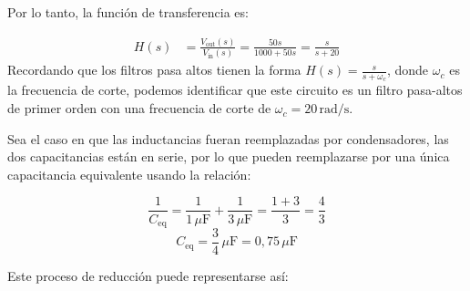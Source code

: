 \documentclass[
  11pt,
  letterpaper,
   addpoints,
   answers
  ]{exam}
\begin{document}
\begin{questions}
\begin{solution}
Por lo tanto, la función de transferencia es:

\begin{align}
    H(s) &= \frac{V_{\text{out}}(s)}{V_{\text{in}}(s)} = \frac{50s}{1000 + 50s} = \frac{s}{s + 20}
\end{align}
Recordando que los filtros pasa altos tienen la forma \( H(s) = \frac{s}{s + \omega_c} \), donde \( \omega_c \) es la frecuencia de corte, podemos identificar que este circuito es un filtro pasa-altos de primer orden con una frecuencia de corte de \( \omega_c = 20\,\mathrm{rad/s} \).

Sea el caso en que las inductancias fueran reemplazadas por condensadores, las dos capacitancias están en serie, por lo que pueden reemplazarse por una única capacitancia equivalente usando la relación:

\[
\frac{1}{C_{\text{eq}}} = \frac{1}{1\,\mu\text{F}} + \frac{1}{3\,\mu\text{F}} = \frac{1 + 3}{3} = \frac{4}{3}
\]
\[
C_{\text{eq}} = \frac{3}{4}\,\mu\text{F} = 0{,}75\,\mu\text{F}
\]

Este proceso de reducción puede representarse así:


\end{solution}
\end{questions}
\end{document}
